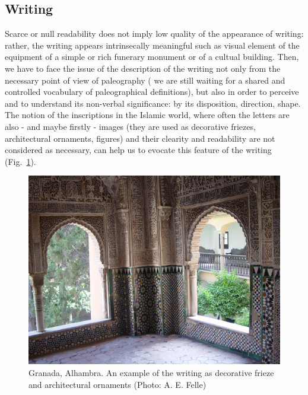 \documentclass[amsthm,ebook]{saparticle}
\begin{document}
\subsection{Writing}


\noindent Scarce or null readability does not imply low quality of the appearance of writing: rather, the writing appears
intrinsecally meaningful such as visual element of the equipment of a simple or rich funerary monument or of a cultual
building. Then, we have to face the issue of the description of the writing not only from the necessary point of
view of paleography ( we are still waiting for a shared and controlled vocabulary of paleographical definitions), but
also in order to perceive and to understand its non-verbal significance: by its disposition, direction, shape. The
notion of the inscriptions in the Islamic world, where often the letters are also - and maybe firstly - images (they
are used as decorative friezes, architectural ornaments, figures) and their clearity and readability are not considered
as necessary, can help us to evocate this feature of the writing (Fig.~\ref{fig:10}).




\begin{figure}[!bp]
\centering
 \includegraphics[width=\columnwidth]{FelleVisualFeaturesofinscriptionsEAGLE2016FullPaper-img014.jpg}
\caption{Granada, Alhambra. An example of the writing as decorative frieze and architectural ornaments (Photo: A. E.
Felle)}
\label{fig:10}
\end{figure}
\end{document}
